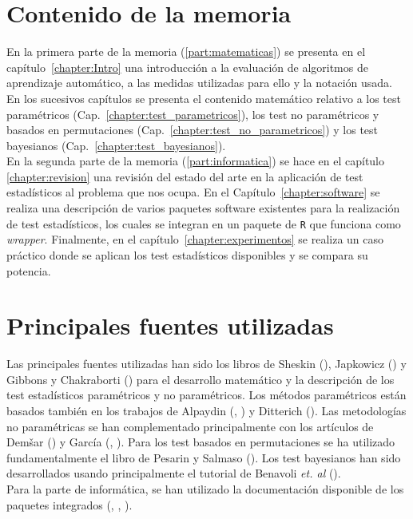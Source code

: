 \section*{Contenido de la memoria}
	En la primera parte de la memoria
(\ref{part:matematicas}) se presenta en el 
capítulo~\ref{chapter:Intro} una introducción a la evaluación 
de algoritmos de aprendizaje automático, a las medidas 
utilizadas para ello y la notación usada. En los 
sucesivos capítulos se presenta el contenido matemático
relativo a los test paramétricos 
(Cap.~\ref{chapter:test_parametricos}), los test no
paramétricos y basados en permutaciones 
(Cap.~\ref{chapter:test_no_parametricos}) y
los test bayesianos (Cap.~\ref{chapter:test_bayesianos}).\\
	En la segunda parte de la memoria 
(\ref{part:informatica}) se hace en el capítulo~
\ref{chapter:revision} una revisión del estado del arte
en la aplicación de test estadísticos al problema que 
nos ocupa. En el Capítulo~\ref{chapter:software} se
realiza una descripción de varios paquetes software 
existentes para la realización de test estadísticos, los
cuales se integran en un paquete de \texttt{R} que funciona
como \textit{wrapper}. Finalmente,
en el capítulo~\ref{chapter:experimentos} se realiza un
caso práctico donde se aplican los test estadísticos
disponibles y se compara su potencia.

\section*{Principales fuentes utilizadas}

	Las principales fuentes utilizadas han sido los libros de
Sheskin
(\cite{sheskin2003handbook}), Japkowicz
(\cite{DBLP:books/cu/Japkowicz2011})
y Gibbons y Chakraborti (\cite{DBLP:reference/stat/GibbonsC11}) 
para el desarrollo matemático
y la descripción de los test estadísticos paramétricos y
no paramétricos. Los métodos paramétricos están basados 
también en los trabajos de Alpaydin (\cite{Alpaydin98combined5},
\cite{Alpaydin:2010:IML:1734076}) y Ditterich
 (\cite{dietterich1998approximate}).
Las metodologías no paramétricas se
han complementado principalmente con los artículos de 
Dem\v{s}ar (\cite{DBLP:journals/jmlr/Demsar06}) y 
García (\cite{garcia2008extension}, 
\cite{DBLP:journals/isci/GarciaFLH10}). Para los test basados
en permutaciones se ha utilizado fundamentalmente el 
libro de Pesarin y Salmaso (\cite{pesarin2010permutation}).
Los test bayesianos han sido desarrollados usando 
principalmente el tutorial de Benavoli \textit{et. al} 
(\cite{DBLP:journals/corr/BenavoliCDZ16}).\\
	Para la parte de informática, se han utilizado la
documentación disponible de los paquetes integrados
(\cite{2015arXiv150104222D}, \cite{scmamp}, 
\cite{DBLP:conf/icml/BenavoliCMZ15}).

